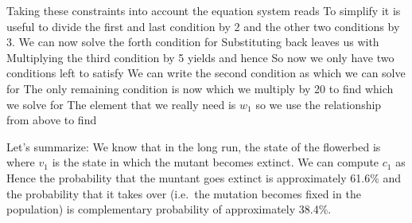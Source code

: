 Taking these constraints into account the equation system reads 
To simplify it is useful to divide the first and last condition by 2 and the other two conditions by 3. 
We can now solve the forth condition for 
Substituting back leaves us with 
Multiplying the third condition by 5 yields 
and hence 
So now we only have two conditions left to satisfy 
We can write the second condition as  
which we can solve for 
The only remaining condition is now 
which we multiply by 20 to find 
which we solve for
The element that we really need is $w_1$ so we use the relationship from above to find

Let's summarize: We know that in the long run, the state of the flowerbed is
where $v_1$ is the state in which the mutant becomes extinct. We can compute $c_1$ as 
Hence the probability that the muntant goes extinct is approximately 61.6\% and the probability that it takes over (i.e.~the mutation becomes fixed in the population) is complementary probability of approximately 38.4\%. 

